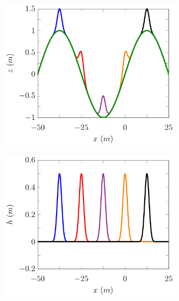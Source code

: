 \begin{figure}
	\centering
	\begin{subfigure}{0.5\textwidth}
		\includegraphics[width=\textwidth]{./chp5/figures/Forced/Dry/P2P/FEVMExw.pdf}
		\vspace{0.5cm}
	\end{subfigure}%
	\begin{subfigure}{0.5\textwidth}
		\includegraphics[width=\textwidth]{./chp5/figures/Forced/Dry/P2P/FEVMExh.pdf}

\end{subfigure}
\end{figure}
